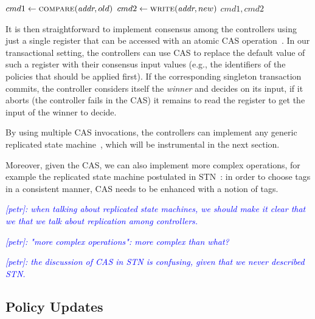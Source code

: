 \documentclass[conference]{sigcomm-alternate}
\newcommand{\cas}{CAS\xspace}
\newcommand{\compare}{compare\xspace}
\newcommand{\memwrite}{write\xspace}
\newcommand{\addr}{\emph{addr}\xspace}
\newcommand{\petr}[1]{\textit{\textcolor{blue}{[petr]: #1}}} %
\begin{document}
\begin{algorithm}[h]
    \caption{$\textit{\cas}(\addr, old,new)$}
    \label{alg:cas}
    \begin{algorithmic}[1]

    		\State $cmd1\gets \textsc{\compare}(\addr, old) $
    		\State $cmd2\gets \textsc{\memwrite}(\addr, new) $
			\Return $cmd1,cmd2$
    \end{algorithmic}
\end{algorithm}

It is then straightforward to implement consensus among the controllers
using just a single register that can be accessed with an atomic CAS
operation~\cite{Her91}. In our transactional setting, the controllers
can use CAS to replace the default value of such a register
with their consensus input values (e.g., the identifiers of the
policies that should be applied first). If the corresponding
singleton transaction commits, the controller considers itself
the \emph{winner} and decides on its input, if
it aborts (the controller fails in the CAS) it remains to read the register to get the input of the
winner to decide.

By using multiple CAS invocations, the controllers can implement any
generic replicated state machine~\cite{Her91,Lam98}, which will be instrumental in the
next section.

Moreover, given the CAS, we can also implement more complex operations,
for example the replicated state machine postulated in STN~\cite{stn}:
in order to choose tags in a consistent manner, CAS needs to be enhanced
with a notion of tags.

\petr{when talking about replicated state machines, we should make it clear that we that we talk about replication among controllers.}

\petr{"more complex operations": more complex than what?}

\petr{the discussion of CAS in STN is confusing, given that we never described STN.}

\subsection{Policy Updates}
\end{document}
